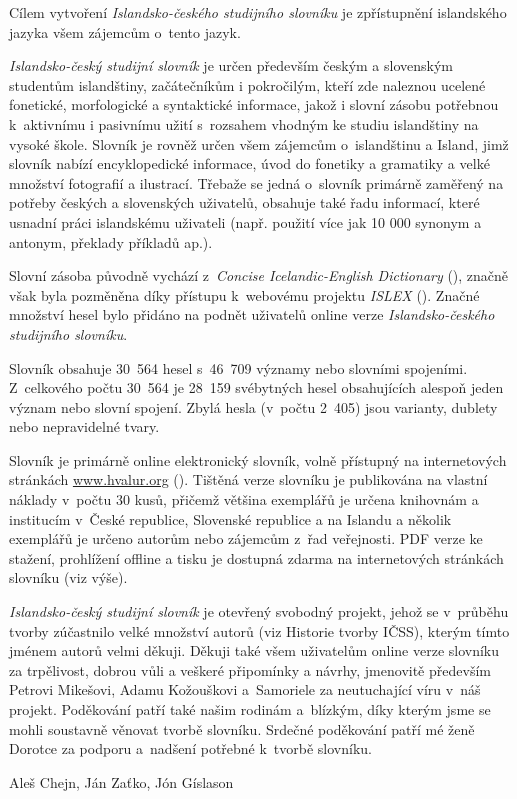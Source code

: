 Cílem vytvoření\textit{ Islandsko-českého studijního slovníku} je zpřístupnění islandského jazyka všem zájemcům o~tento jazyk. 

\textit{Islandsko-český studijní slovník} je určen především českým a slovenským studentům islandštiny, začátečníkům i pokročilým, kteří zde naleznou ucelené fonetické, morfologické a syntaktické informace, jakož i
slovní zásobu potřebnou k~aktivnímu i pasivnímu užití s~rozsahem vhodným ke studiu islandštiny na vysoké škole.
Slovník je rovněž určen všem zájemcům o~islandštinu a Island, jimž slovník nabízí encyklopedické informace, úvod do fonetiky a gramatiky a velké množství fotografií a ilustrací. 
Třebaže se jedná o~slovník primárně zaměřený na potřeby českých a slovenských uživatelů, obsahuje také řadu informací, které usnadní práci islandskému uživateli (např. použití více jak 10 000 synonym a antonym, překlady příkladů ap.).

Slovní zásoba původně vychází z~\textit{Concise Icelandic-English Dictionary} (\cite {ic_en}), značně však byla pozměněna díky přístupu k~webovému projektu \textit{ISLEX} (\cite {int1}). Značné množství hesel bylo
přidáno na podnět uživatelů online verze \textit{Islandsko-českého studijního slovníku}.

Slovník obsahuje 30~564 hesel s~46~709 významy nebo slovními spojeními. Z~celkového počtu 30~564 je 28~159 svébytných hesel obsahujících alespoň jeden význam nebo slovní spojení. 
Zbylá hesla (v~počtu 2~405) jsou varianty, dublety nebo nepravidelné tvary.

Slovník je primárně online elektronický slovník, volně přístupný na internetových stránkách \url{www.hvalur.org}  (\cite {int14}). 
Tištěná verze slovníku je publikována na vlastní náklady v~počtu 30 kusů, přičemž většina exemplářů je určena knihovnám a institucím v~České republice, Slovenské republice a na Islandu a
několik exemplářů je určeno autorům nebo zájemcům z~řad veřejnosti. PDF verze ke stažení, prohlížení offline a tisku je dostupná zdarma na internetových stránkách slovníku (viz výše).


\textit{Islandsko-český studijní slovník} je otevřený svobodný projekt, jehož se v~průběhu tvorby zúčastnilo velké množství autorů (viz Historie tvorby IČSS), kterým tímto jménem autorů velmi děkuji.
Děkuji také všem uživatelům online verze slovníku za trpělivost, dobrou vůli a veškeré připomínky a návrhy, jmenovitě především Petrovi Mikešovi, Adamu Kožouškovi a~Samoriele za neutuchající víru v~náš projekt.
Poděkování patří také našim rodinám a~blízkým, díky kterým jsme se mohli soustavně věnovat tvorbě slovníku.
Srdečné poděkování patří mé ženě Dorotce za podporu a~nadšení potřebné k~tvorbě slovníku.


\blspace[5]

{\centering Aleš Chejn, Ján Zaťko, Jón Gíslason\par}
